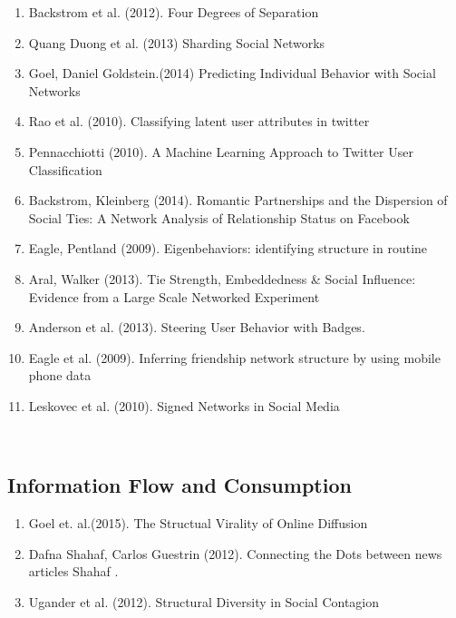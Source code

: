 \begin{enumerate}  
\item Backstrom et al. (2012). Four Degrees of Separation \cite{Backstrom:2012:FDS:2380718.2380723}
\item  Quang Duong et al. (2013)  Sharding Social Networks\cite{Duong_2013}   
\item  Goel, Daniel  Goldstein.(2014)  Predicting Individual Behavior with Social Networks \cite{Goel_2014} 
\item Rao et al. (2010). Classifying latent user attributes in twitter\cite{Rao_2010}
\item Pennacchiotti (2010). A Machine Learning Approach to Twitter User Classification\cite{pennacchiotti2011machine}
\item Backstrom, Kleinberg (2014). Romantic Partnerships and the Dispersion of Social Ties: A Network Analysis of Relationship Status on Facebook\cite{Backstrom_2014}
\item Eagle, Pentland (2009). Eigenbehaviors: identifying structure in routine\cite{Eagle_2009}
\item Aral, Walker (2013). Tie Strength, Embeddedness & Social Influence: Evidence from a Large Scale Networked Experiment \cite{Aral}
\item Anderson et al. (2013). Steering User Behavior with Badges. \cite{Anderson:2013:SUB:2488388.2488398}
\item Eagle et al. (2009). Inferring friendship network structure by using mobile phone data \cite{Eagle_2009}
\item Leskovec et al. (2010). Signed Networks in Social Media \cite{Leskovec_2010}

\end{enumerate}  
\\  
\subsection{Information Flow and Consumption}  
\begin{enumerate}  

\item  Goel et.  al.(2015).  The Structual Virality of Online Diffusion\cite{Goel_2015}  
\item  Dafna Shahaf, Carlos Guestrin (2012). Connecting the Dots between news articles Shahaf  . \cite{Shahaf:2012:CTD:2086737.2086744} 
\item Ugander et al. (2012). Structural Diversity in Social Contagion \cite{Ugander_2012}
\end{enumerate}  
\\  
